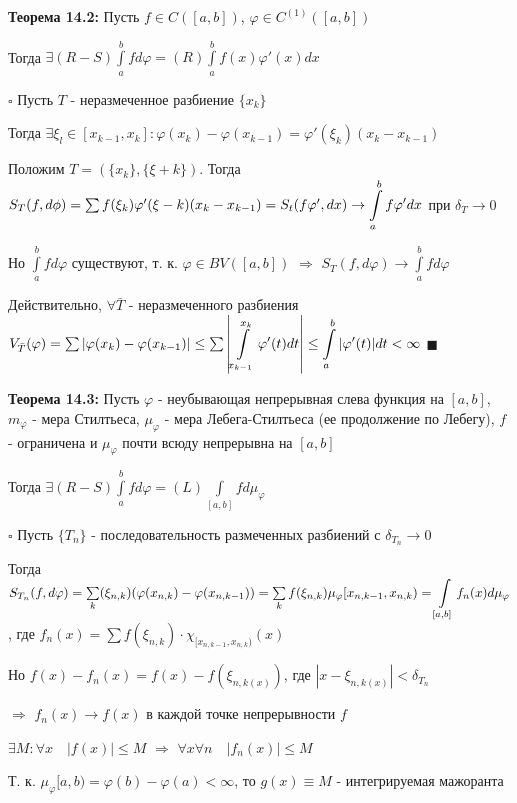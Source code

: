 \documentclass[a4paper]{report}
\newcommand*{\hm}[1]{#1\nobreak\discretionary{}%
            {\hbox{$\mathsurround=0pt #1$}}{}}
\begin{document}
\noindent\textbf{Теорема 14.2:} Пусть $f\in C([a,b])$, $\varphi\in C^{(1)}([a,b])$

 Тогда $\exists(R-S)\displaystyle\int\limits_a^b fd\varphi=(R)\displaystyle\int\limits_a^b f(x)\varphi'(x)dx$

\noindent $\square$ Пусть $T$ - неразмеченное разбиение $\{x_k\}$

Тогда $\exists\xi_l\in[x_{k-1},x_k]\colon\varphi(x_k)-\varphi(x_{k-1})=\varphi'(\xi_k)(x_k-x_{k-1})$

Положим $T=(\{x_k\},\{\xi+k\})$. Тогда $S_T(f,d\phi)=\sum f(\xi_k)\varphi'(\xi-k)(x_k\hm-x_{k-1})=S_t(f\varphi',dx)\to\displaystyle\int\limits_a^b f\varphi'dx$ при $\delta_T\to0$

Но $\displaystyle\int\limits_a^b fd\varphi$ существуют, т. к. $\varphi\in BV([a,b])$ $\Rightarrow$ $S_T(f,d\varphi)\to\displaystyle\int\limits_a^b fd\varphi$

Действительно, $\forall\bar T$ - неразмеченного разбиения $V_{\bar T}(\varphi)=\sum|\varphi(x_k)\hm-\varphi(x_{k-1})|\le\sum\left|\displaystyle\int\limits_{x_{k-1}}^{x_k}\varphi'(t)dt\right|\le\displaystyle\int\limits_a^b|\varphi'(t)|dt<\infty$ $\blacksquare$
\bigskip

\noindent\textbf{Теорема 14.3:} Пусть $\varphi$ - неубывающая непрерывная слева функция на $[a,b]$, $m_\varphi$ - мера Стилтьеса, $\mu_\varphi$ - мера Лебега-Стилтьеса (ее продолжение по Лебегу), $f$ - ограничена и $\mu_\varphi$ почти всюду непрерывна на $[a,b]$

Тогда $\exists(R-S)\displaystyle\int\limits_a^b fd\varphi=(L)\displaystyle\int\limits_{[a,b]}fd\mu_{\varphi}$

\noindent $\square$ Пусть $\{T_n\}$ - последовательность размеченных разбиений с $\delta_{T_n}\to0$

 Тогда $S_{T_n}(f,d\varphi)=\sum\limits_k(\xi_{n,k})(\varphi(x_{n,k})-\varphi(x_{n,k-1}))=\sum\limits_k f(\xi_{n,k})\mu_\varphi[x_{n,k-1},x_{n,k})\hm=\displaystyle\int\limits_{[a,b]}f_n(x)d\mu_\varphi$, где $f_n(x)=\sum f(\xi_{n,k})\cdot\chi_{[x_{n,k-1},x_{n,k})}(x)$

Но $f(x)-f_n(x)=f(x)-f(\xi_{n,k(x)})$, где $|x-\xi_{n,k(x)}|<\delta_{T_n}$

$\Rightarrow$ $f_n(x)\to f(x)$ в каждой точке непрерывности $f$

$\exists M\colon\forall x\quad|f(x)|\le M$ $\Rightarrow$ $\forall x\forall n\quad|f_n(x)|\le M$

Т. к. $\mu_\varphi[a,b)=\varphi(b)-\varphi(a)<\infty$, то $g(x)\equiv M$ - интегрируемая мажоранта
\end{document}
